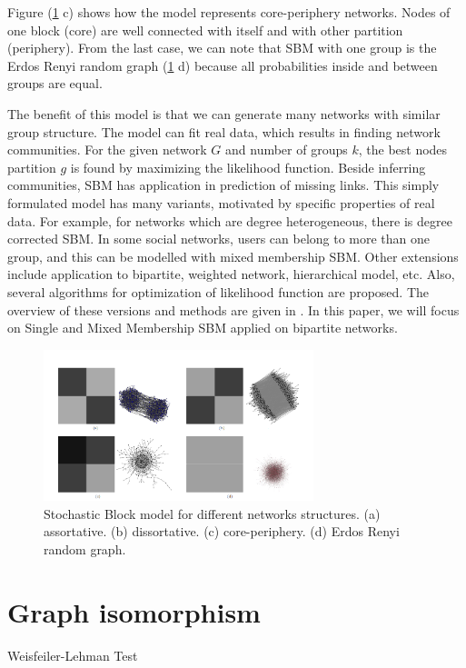 Figure (\ref{fig:SBM} c) shows how the model represents core-periphery networks. Nodes of one block (core) are well connected with itself and with other partition (periphery). From the last case, we can note that SBM with one group is the Erdos Renyi random graph (\ref{fig:SBM} d) because all probabilities inside and between groups are equal.

The benefit of this model is that we can generate many networks with similar group structure. The model can fit real data, which results in finding network communities. For the given network $G$ and number of groups $k$, the best nodes partition $g$ is found by maximizing the likelihood function. Beside inferring communities, SBM has application in prediction of missing links. This simply formulated model has many variants, motivated by specific properties of real data. For example, for networks which are degree heterogeneous, there is degree corrected SBM. In some social networks, users can belong to more than one group, and this can be modelled with mixed membership SBM. Other extensions include application to bipartite, weighted network, hierarchical model, etc. Also, several algorithms for optimization of likelihood function are proposed. The overview of these versions and methods are given in \cite{comparison}. In this paper, we will focus on Single and Mixed Membership SBM applied on bipartite networks.  
\begin{figure}
	\centering
	\includegraphics[width=0.7\textwidth]{Figures/structures.png}
	\caption{Stochastic Block model for different networks structures. (a) assortative. (b) dissortative. (c) core-periphery. (d) Erdos Renyi random graph.}
	\label{fig:SBM}
\end{figure}


\section{Graph isomorphism}

Weisfeiler-Lehman Test

